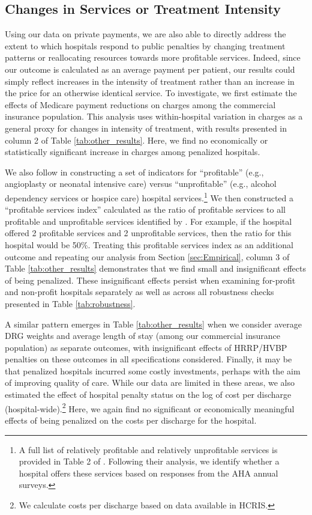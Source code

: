 \documentclass[12pt]{article}
\begin{document}
\subsection{Changes in Services or Treatment Intensity}
Using our data on private payments, we are also able to directly address the extent to which hospitals respond to public penalties by changing treatment patterns or reallocating resources towards more profitable services. Indeed, since our outcome is calculated as an average payment per patient, our results could simply reflect increases in the intensity of treatment rather than an increase in the price for an otherwise identical service.  To investigate, we first estimate the effects of Medicare payment reductions on charges among the commercial insurance population. This analysis uses within-hospital variation in charges as a general proxy for changes in intensity of treatment, with results presented in column 2 of Table \ref{tab:other_results}. Here, we find no economically or statistically significant increase in charges among penalized hospitals.

We also follow \cite{horwitz2009} in constructing a set of indicators for ``profitable'' (e.g., angioplasty or neonatal intensive care) versus ``unprofitable'' (e.g., alcohol dependency services or hospice care) hospital services.\footnote{A full list of relatively profitable and relatively unprofitable services is provided in Table 2 of \cite{horwitz2009}. Following their analysis, we identify whether a hospital offers these services based on responses from the AHA annual surveys.} We then constructed a ``profitable services index'' calculated as the ratio of profitable services to all profitable and unprofitable services identified by \cite{horwitz2009}. For example, if the hospital offered 2 profitable services and 2 unprofitable services, then the ratio for this hospital would be 50\%. Treating this profitable services index as an additional outcome and repeating our analysis from Section \ref{sec:Empirical}, column 3 of Table \ref{tab:other_results} demonstrates that we find small and insignificant effects of being penalized. These insignificant effects persist when examining for-profit and non-profit hospitals separately as well as across all robustness checks presented in Table \ref{tab:robustness}.

A similar pattern emerges in Table \ref{tab:other_results} when we consider average DRG weights and average length of stay (among our commercial insurance population) as separate outcomes, with insignificant effects of HRRP/HVBP penalties on these outcomes in all specifications considered.  Finally, it may be that penalized hospitals incurred some costly investments, perhaps with the aim of improving quality of care. While our data are limited in these areas, we also estimated the effect of hospital penalty status on the log of cost per discharge (hospital-wide).\footnote{We calculate costs per discharge based on data available in HCRIS.} Here, we again find no significant or economically meaningful effects of being penalized on the costs per discharge for the hospital.
\end{document}
